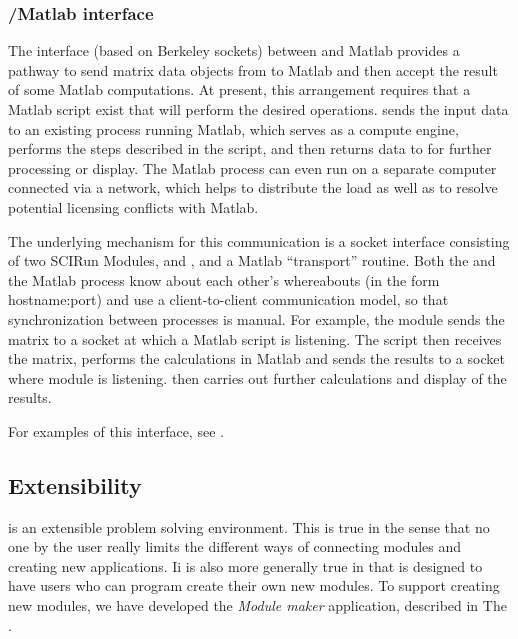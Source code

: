 \subsubsection{\SR{}/Matlab interface}
\label{sec:concept-matlab} 

The interface (based on Berkeley sockets) between \SR{} and Matlab provides
a pathway to send matrix data objects from \SR{} to Matlab and then accept
the result of some Matlab computations.  At present, this arrangement
requires that a Matlab script exist that will perform the desired
operations.  \SR{} sends the input data to an existing process running
Matlab, which serves as a compute engine, performs the steps
described in the script, and then returns data to \SR{} for further
processing or display.  The Matlab process can even run on a separate
computer connected via a network, which helps to distribute the load as
well as to resolve potential licensing conflicts with Matlab.

The underlying mechanism for this communication is a socket interface
consisting of two SCIRun Modules,  and
, and a Matlab ``transport'' routine.  Both the \SR{}
and the Matlab process know about each other's whereabouts (in the form
hostname:port) and use a client-to-client communication model, so that
synchronization between processes is manual.  For example, 
the \SR{}  module sends the matrix to a socket at which a 
Matlab script is listening.  The script then receives the matrix, 
performs the calculations in Matlab and sends the results to a socket 
where  module is listening.  \SR then carries out
further calculations and display of the results.

For examples of this interface, see .

\subsection{Extensibility}
\label{sec:con-extend} 

\SR{} is an extensible  problem solving environment.
This is true in the sense that no one by the user really limits the
different ways of connecting modules and creating new applications.  Ii is
also more generally true in that \SR{} is designed to have users who can
program create their own new modules.  To support creating new modules, we
have developed the \emph{Module maker} application, described in The
.

